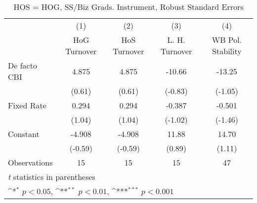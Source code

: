 \begin{table}[htbp]\centering
\def\sym#1{\ifmmode^{#1}\else\(^{#1}\)\fi}
\caption{HOS = HOG, SS/Biz Grads. Instrument, Robust Standard Errors \label{hoshogfivs4}}
\begin{tabular}{l*{4}{c}}
\toprule
                                        &\multicolumn{1}{c}{(1)}&\multicolumn{1}{c}{(2)}&\multicolumn{1}{c}{(3)}&\multicolumn{1}{c}{(4)}\\
                                        &\multicolumn{1}{c}{HoG Turnover}&\multicolumn{1}{c}{HoS Turnover}&\multicolumn{1}{c}{L. H. Turnover}&\multicolumn{1}{c}{WB Pol. Stability}\\
\midrule
De facto CBI                            &    4.875         &    4.875         &   -10.66         &   -13.25         \\
                                        &   (0.61)         &   (0.61)         &  (-0.83)         &  (-1.05)         \\
\addlinespace
Fixed Rate                              &    0.294         &    0.294         &   -0.387         &   -0.501         \\
                                        &   (1.04)         &   (1.04)         &  (-1.02)         &  (-1.46)         \\
\addlinespace
Constant                                &   -4.908         &   -4.908         &    11.88         &    14.70         \\
                                        &  (-0.59)         &  (-0.59)         &   (0.89)         &   (1.11)         \\
\midrule
Observations                            &       15         &       15         &       15         &       47         \\
\bottomrule
\multicolumn{5}{l}{\footnotesize \textit{t} statistics in parentheses}\\
\multicolumn{5}{l}{\footnotesize \sym{*} \(p<0.05\), \sym{**} \(p<0.01\), \sym{***} \(p<0.001\)}\\
\end{tabular}
\end{table}
